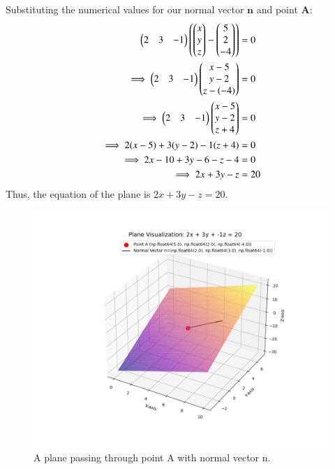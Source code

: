 \documentclass[journal]{IEEEtran}
\begin{document}
Substituting the numerical values for our normal vector $\mathbf{n}$ and point $\mathbf{A}$:
\begin{align*}
    \begin{pmatrix}2 & 3 & -1\end{pmatrix} \left( \begin{pmatrix}x\\y\\z\end{pmatrix} - \begin{pmatrix}5\\2\\-4\end{pmatrix} \right) &= 0 \\
    \implies \begin{pmatrix}2 & 3 & -1\end{pmatrix} \begin{pmatrix}x-5\\y-2\\z-(-4)\end{pmatrix} &= 0 \\
    \implies \begin{pmatrix}2 & 3 & -1\end{pmatrix} \begin{pmatrix}x-5\\y-2\\z+4\end{pmatrix} &= 0 \\
    \implies 2(x-5) + 3(y-2) - 1(z+4) &= 0 \\
    \implies 2x - 10 + 3y - 6 - z - 4 &= 0 \\
    \implies 2x + 3y - z &= 20
\end{align*}
Thus, the equation of the plane is $2x + 3y - z = 20$.
\begin{figure}[h!]
\begin{center}
\includegraphics[width=\columnwidth]{figs/fig3.png}
\end{center}
\caption{A plane passing through point A with normal vector n.}
\label{fig:Fig.1}
\end{figure}
\end{document}
